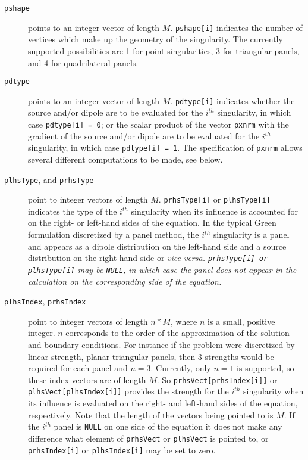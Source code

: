 \begin{description}
\item[{\tt pshape}] points to an integer vector of length $M$. 
{\tt pshape[i]} indicates the number of vertices which make up the 
geometry of the singularity.  The currently supported possibilities are
1 for point singularities, 3 for triangular panels, and 4 for quadrilateral
panels.

\item[{\tt pdtype}] points to an integer vector of length $M$. 
{\tt pdtype[i]} indicates whether the source and/or dipole are to 
be evaluated for the $i^{th}$ singularity, in which case {\tt pdtype[i] = 0}; 
or the scalar product of the vector {\tt pxnrm} with the gradient of the  
source and/or dipole are to be evaluated for the $i^{th}$ singularity,
in which case {\tt pdtype[i] = 1}.  The specification
of {\tt pxnrm} allows several different computations to be made, see
below.

\item[{\tt plhsType}, {\rm and} {\tt prhsType}] point to integer vectors of length 
$M$.  {\tt prhsType[i]} or {\tt plhsType[i]} indicates the type of 
the $i^{th}$ singularity when its influence is accounted for on the right- or
left-hand sides of the equation.  In 
the typical Green formulation discretized by a panel method, the  $i^{th}$
singularity is a panel and appears as a dipole distribution on the left-hand
side and a source distribution on the right-hand side or \it vice versa.  \rm
{\tt prhsType[i] or plhsType[i]} may be {\tt NULL}, in which case the panel 
does not appear in the calculation on the corresponding side of the equation.

\item[{\tt plhsIndex}, {\tt prhsIndex}] point to integer vectors of 
length $n*M$, where $n$ is a small, positive integer. $n$ corresponds to 
the order of the approximation of the solution and boundary conditions. For
instance if the problem were discretized by linear-strength, planar 
triangular panels, then 3 strengths would be required for each panel and
$n=3$.  Currently, only $n=1$ is supported, so these index vectors are
of length $M$. So {\tt prhsVect[prhsIndex[i]]} or {\tt plhsVect[plhsIndex[i]]}
provides the strength for the $i^{th}$ singularity when its influence is
evaluated on the right- and left-hand sides of the equation, respectively.
Note that the length of the vectors being pointed to is $M$.  If the
$i^{th}$  panel is {\tt NULL} on one side of the equation it does not make 
any difference what element of {\tt prhsVect} or {\tt plhsVect} is 
pointed to, or {\tt prhsIndex[i]} or {\tt plhsIndex[i]} may be set to zero.


\end{description}
